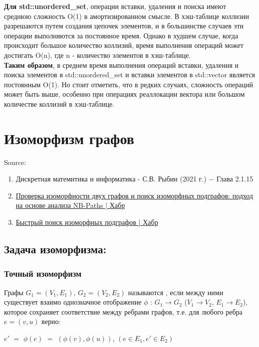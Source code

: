             \textbf{Для std::unordered\_set}, операции вставки, удаления и поиска имеют среднюю сложность O(1) в амортизированном смысле. В хэш-таблице коллизии разрешаются путем создания цепочек элементов, и в большинстве случаев эти операции выполняются за постоянное время. Однако в худшем случае, когда происходит большое количество коллизий, время выполнения операций может достигать O(n), где n - количество элементов в хэш-таблице.\\

            \textbf{Таким образом}, в среднем время выполнения операций вставки, удаления и поиска элементов в std::unordered\_set и вставки элементов в std::vector является постоянным O(1). Но стоит отметить, что в редких случаях, сложность операций может быть выше, особенно при операциях реаллокации вектора или большом количестве коллизий в хэш-таблице.
\section{Изоморфизм графов}
    Source:
    \begin{enumerate}
        \item Дискретная матемитика и информатика - С.В. Рыбин (2021 г.) $-$ Глава 2.1.15
        \item \href{https://habr.com/ru/articles/491846/}{Проверка изоморфности двух графов и поиск изоморфных подграфов: подход на основе анализа NB-Paths | Хабр}
        \item \href{https://habr.com/ru/articles/723328/}{Быстрый поиск изоморфных подграфов | Хабр}
    \end{enumerate}
    \subsection{Задача изоморфизма:}
        \subsubsection{Точный изоморфизм}
            \begin{definition}
                Графы $G_1 = (V_1, E_1)$, $G_2 = (V_2, E_2)$ называются , если между ними существует взаимо однозначное отображение $\phi$ : $G_1 \longrightarrow G_2$ ($V_1 \longrightarrow V_2$, $E_1 \longrightarrow E_2$), которое сохраняет соответствие между ребрами графов, т.е. для любого ребра $e = (v, u)$ верно:
                \begin{center}
                    $e'$ $=$ $\phi(e)$ $=$ $(\phi(v), \phi(u))$, \quad $(e \in E_1, e' \in E_2)$
                \end{center}
            \end{definition}


